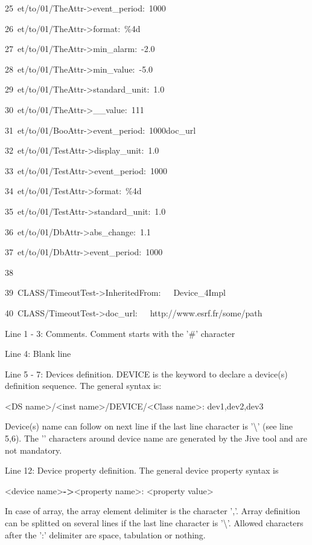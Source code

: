 \begin{lyxcode}
25~et/to/01/TheAttr->event\_period:~1000

26~et/to/01/TheAttr->format:~\%4d

27~et/to/01/TheAttr->min\_alarm:~-2.0

28~et/to/01/TheAttr->min\_value:~-5.0

29~et/to/01/TheAttr->standard\_unit:~1.0

30~et/to/01/TheAttr->\_\_value:~111

31~et/to/01/BooAttr->event\_period:~1000doc\_url

32~et/to/01/TestAttr->display\_unit:~1.0

33~et/to/01/TestAttr->event\_period:~1000

34~et/to/01/TestAttr->format:~\%4d

35~et/to/01/TestAttr->standard\_unit:~1.0

36~et/to/01/DbAttr->abs\_change:~1.1

37~et/to/01/DbAttr->event\_period:~1000

38

39~CLASS/TimeoutTest->InheritedFrom:~~~Device\_4Impl

40~CLASS/TimeoutTest->doc\_url:~~~\textquotedbl{}http://www.esrf.fr/some/path\textquotedbl{}
\end{lyxcode}


Line 1 - 3: Comments. Comment starts with the '\#' character

Line 4: Blank line

Line 5 - 7: Devices definition. \textquotedbl{}DEVICE\textquotedbl{}
is the keyword to declare a device(s) definition sequence. The general
syntax is:\begin{center}<DS name>/<inst name>/DEVICE/<Class name>:
dev1,dev2,dev3\end{center}Device(s) name can follow on next line
if the last line character is '\textbackslash{}' (see line 5,6). The
'\textquotedbl{}' characters around device name are generated by the
Jive tool and are not mandatory.

Line 12: Device property definition. The general device property syntax
is \begin{center}<device name>\textbf{->}<property name>: <property
value>\end{center}In case of array, the array element delimiter is
the character ','. Array definition can be splitted on several lines
if the last line character is '\textbackslash{}'. Allowed characters
after the ':' delimiter are space, tabulation or nothing.

